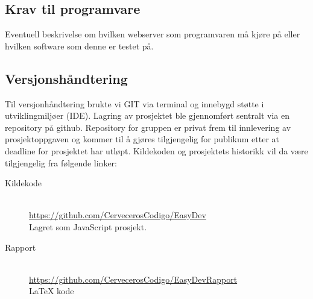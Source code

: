 \subsection{Krav til programvare}
Eventuell beskrivelse om hvilken webserver som programvaren må kjøre på eller
hvilken software som denne er testet på.

\subsection{Versjonshåndtering}
Til versjonhåndtering brukte vi GIT via terminal og innebygd støtte i utviklingmiljøer (IDE). Lagring av prosjektet ble gjennomført sentralt via en repository på github. Repository for gruppen er privat frem til innlevering av prosjektoppgaven og kommer til å gjøres tilgjengelig for publikum etter at deadline for prosjektet har utløpt. Kildekoden og prosjektets historikk vil da være tilgjengelig fra følgende linker:

\begin{description}
\item[Kildekode]
\hfill \\
\url{https://github.com/CervecerosCodigo/EasyDev}
\\Lagret som JavaScript prosjekt.

\item[Rapport]
\hfill \\
\url{https://github.com/CervecerosCodigo/EasyDevRapport}
\\ \LaTeX{} kode
\end{description}

